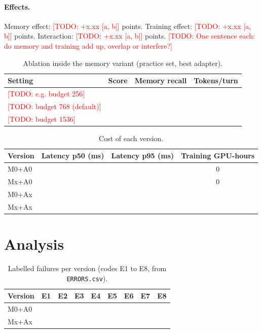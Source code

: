 \documentclass[11pt]{article}
\newcommand{\groupid}{G00}
\newcommand{\todo}[1]{\textcolor{red}{[TODO: #1]}}
\begin{document}
\paragraph{Effects.} Memory effect: \todo{+x.xx [a, b]} points. Training effect: \todo{+x.xx [a, b]}
points. Interaction: \todo{+x.xx [a, b]} points. \todo{One sentence each: do memory and training add up,
overlap or interfere?}

\begin{table}[h]
\centering\small
\caption{Ablation inside the memory variant (practice set, best adapter).}
\label{tab:\groupid-ablation}
\begin{tabular}{lccc}
\toprule
Setting & Score & Memory recall & Tokens/turn \\
\midrule
\todo{e.g. budget 256} & & & \\
\todo{budget 768 (default)} & & & \\
\todo{budget 1536} & & & \\
\bottomrule
\end{tabular}
\end{table}

\begin{table}[h]
\centering\small
\caption{Cost of each version.}
\label{tab:\groupid-cost}
\begin{tabular}{lccc}
\toprule
Version & Latency p50 (ms) & Latency p95 (ms) & Training GPU-hours \\
\midrule
M0+A0 & & & 0 \\
Mx+A0 & & & 0 \\
M0+Ax & & & \\
Mx+Ax & & & \\
\bottomrule
\end{tabular}
\end{table}

\section{Analysis}
\label{sec:\groupid-analysis}

\begin{table}[h]
\centering\small
\caption{Labelled failures per version (codes E1 to E8, from \texttt{ERRORS.csv}).}
\label{tab:\groupid-errors}
\begin{tabular}{lcccccccc}
\toprule
Version & E1 & E2 & E3 & E4 & E5 & E6 & E7 & E8 \\
\midrule
M0+A0 & & & & & & & & \\
Mx+Ax & & & & & & & & \\
\bottomrule
\end{tabular}
\end{table}
\end{document}
